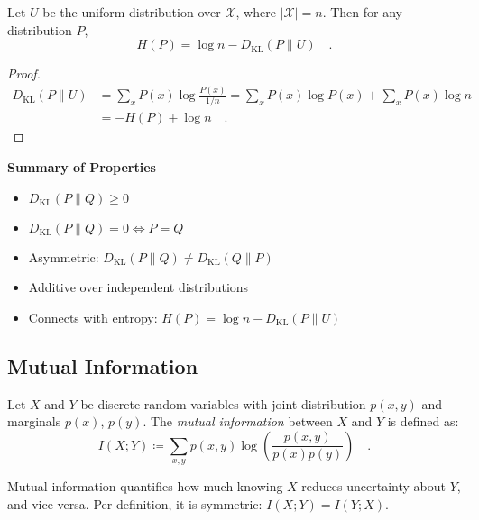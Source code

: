 \documentclass[../../main.tex]{subfiles}
\begin{document}
\begin{proposition}
    Let \( U \) be the uniform distribution over \( \mathcal{X} \), where \( |\mathcal{X}| = n \). Then for any distribution \( P \),
    \[
        H(P) = \log n - D_{\mathrm{KL}}(P \| U) \quad .
    \]
\end{proposition}
\begin{proof}
    \begin{align*}
        D_{\mathrm{KL}}(P \| U) &= \sum_{x} P(x) \log \frac{P(x)}{1/n}
        = \sum_{x} P(x) \log P(x) + \sum_{x} P(x) \log n \\
        &= -H(P) + \log n \quad .
    \end{align*}
\end{proof}

\textbf{Summary of Properties}

\begin{itemize}[leftmargin=1.2cm]
    \item \( D_{\mathrm{KL}}(P \| Q) \geq 0 \)
    \item \( D_{\mathrm{KL}}(P \| Q) = 0 \iff P = Q \)
    \item Asymmetric: \( D_{\mathrm{KL}}(P \| Q) \neq D_{\mathrm{KL}}(Q \| P) \)
    \item Additive over independent distributions
    \item Connects with entropy: \( H(P) = \log n - D_{\mathrm{KL}}(P \| U) \)
\end{itemize}


\subsection{Mutual Information}
\label{sec:mutual_information}

\begin{definition}
    Let \( X \) and \( Y \) be discrete random variables with joint distribution \( p(x, y) \) and marginals \( p(x) \), \( p(y) \). The \emph{mutual information} between \( X \) and \( Y \) is defined as:
    \[
        I(X; Y) \coloneqq \sum_{x, y} p(x, y) \log \left( \frac{p(x, y)}{p(x) p(y)} \right) \quad .
    \]
\end{definition}

\begin{remark}
    Mutual information quantifies how much knowing \( X \) reduces uncertainty about \( Y \), and vice versa. Per definition, it is symmetric: \( I(X; Y) = I(Y; X) \).
\end{remark}
\end{document}
